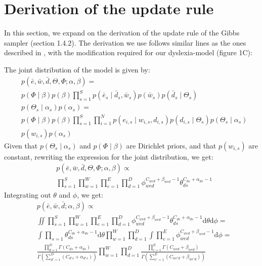 \chapter{Derivation of the update rule}
In this section, we expand on the derivation of the update rule of the Gibbs sampler (section 1.4.2). The derivation we use follows similar lines as the ones described in \citet{gs04}, with the modification required for our dyslexia-model (figure 1C):

The joint distribution of the model is given by:
\begin{equation*}
\begin{split}
&p(\bar{e},\bar{w},\bar{d},\Theta,\Phi;\alpha,\beta) = \\
&p(\Phi\mid\beta)p(\beta)\prod_{s = 1}^S p(\bar{e}_s\mid\bar{d}_s, \bar{w}_s) p(\bar{w}_s)p(\bar{d}_s\mid\Theta_s)\\ &p(\Theta_s\mid\alpha_s)p(\alpha_s) = \\
&p(\Phi\mid\beta) p(\beta) \prod_{s = 1}^S \prod_{i=1}^N p(e_{i, s} \mid w_{i, s}, d_{i, s}) p(d_{i, s}\mid\Theta_s) p(\Theta_s\mid\alpha_s)\\
&p(w_{i, s}) p(\alpha_s)
\end{split}
\end{equation*}
Given that $p(\Theta_s\mid\alpha_s)$ and $p(\Phi\mid\beta)$ are Dirichlet priors, and that $p(w_{i, s})$ are constant, rewriting the expression for the joint distribution, we get:
\begin{equation*}
\begin{split}
&p(\bar{e}, \bar{w}, \bar{d}, \Theta, \Phi; \alpha, \beta) \propto \\
&\prod_{s=1}^S \prod_{w=1}^W \prod_{e=1}^E \prod_{d = 1}^D \phi_{wed}^{C_{wed} + \beta_{wed} - 1} \theta_{ds}^{C_{ds} + \alpha_{ds} - 1}
\end{split}
\end{equation*}
Integrating out $\theta$ and $\phi$, we get:
\begin{equation*}
\begin{split}
&p(\bar{e},\bar{w},\bar{d};\alpha,\beta) \propto \\
&\iint \prod_{s=1}^S \prod_{w=1}^W \prod_{e=1}^E \prod_{d = 1}^D  \phi_{wed}^{C_{wed} + \beta_{wed} - 1} \theta_{ds}^{C_{ds} + \alpha_{ds} - 1} \mathrm{d}\theta \mathrm{d}\phi = \\
&\int \prod_{s=1} \theta_{ds}^{C_{ds} + \alpha_{ds} - 1} \mathrm{d}\theta \prod_{w=1}^W \prod_{d = 1}^D \int\prod_{e=1}^E \phi_{wed}^{C_{wed} + \beta_{wed} - 1} \mathrm{d}\phi = \\
&\frac{\prod_{d = 1}^D\Gamma(C_{ds} + \alpha_{ds})}{\Gamma(\sum_{d' = 1}^D (C_{d's} + \alpha_{d's}))}\prod_{w=1}^W\prod_{d = 1}^D \frac{\prod_{e = 1}^E\Gamma(C_{wed} + \beta_{wed})}{\Gamma(\sum_{e' = 1}^E (C_{we'd} + \beta_{we'd}))}
\end{split}
\end{equation*}
